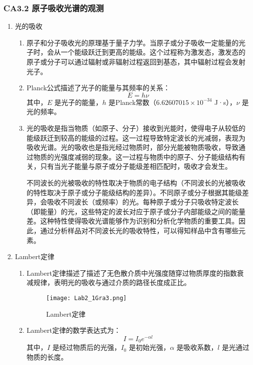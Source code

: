 \documentclass[dvipsnames, svgnames,a4paper,11pt]{article}
\begin{document}
	\subsubsection{CA3.2 原子吸收光谱的观测}
	\begin{enumerate}
		\item 光的吸收
		\begin{enumerate}
			\item 原子和分子吸收光的原理基于量子力学。当原子或分子吸收一定能量的光子时，会从一个能级跃迁到更高的能级。这个过程称为激发态，激发态的原子或分子可以通过辐射或非辐射过程返回到基态，其中辐射过程会发射光子。
			\item Planck公式描述了光子的能量与其频率的关系：
			\[ E = h\nu \]
			其中，\(E\) 是光子的能量，\(h\) 是Planck常数（\(6.62607015 \times 10^{-34}\) J·s），\(\nu\) 是光的频率。
			\item 光的吸收是指当物质（如原子、分子）接收到光能时，使得电子从较低的能级跃迁到较高的能级的过程。这一过程导致特定波长的光减弱，表现为吸收光谱。光的吸收也是指光经过物质时，部分光能被物质吸收，导致通过物质的光强度减弱的现象。这一过程与物质中的原子、分子能级结构有关，只有当光子能量与原子或分子能级差相匹配时，吸收才会发生。
			
			不同波长的光被吸收的特性取决于物质的电子结构（不同波长的光被吸收的特性取决于原子或分子能级结构的差异）。不同原子或分子根据其能级差异，会吸收不同波长（或频率）的光。每种原子或分子只吸收特定波长（即能量）的光，这些特定的波长对应于原子或分子内部能级之间的能量差。这种特性使得吸收光谱能够作为识别和分析化学物质的重要工具。因此，通过分析样品对不同波长光的吸收特性，可以得知样品中含有哪些元素。
		\end{enumerate}
		
		\item Lambert定律
		\begin{enumerate}
			\item Lambert定律描述了描述了无色散介质中光强度随穿过物质厚度的指数衰减规律，表明光的吸收与通过介质的路径长度成正比。
			
			\begin{figure}[htbp]
				\centering
				\texttt{[image: Lab2\_1Gra3.png]}
				\caption{Lambert定律}
				\label{fig:fig3}
			\end{figure}
			
			\item Lambert定律的数学表达式为：
			\[ I = I_0 e^{-\alpha l} \]
			其中，\(I\) 是经过物质后的光强，\(I_0\) 是初始光强，\(\alpha\) 是吸收系数，\(l\) 是光通过物质的长度。
		\end{enumerate}
		

\end{enumerate}
\end{document}
